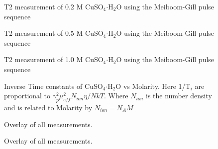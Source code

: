   \begin{figure}[h]
    \resizebox{0.75\textwidth}{!}{}
    \caption{T2 measurement of 0.2 M CuSO$_{4} \boldsymbol{\cdot} $H$_2$O using the Meiboom-Gill pulse sequence }
    \label{figAp:0d2_t2}
  \end{figure}

  \begin{figure}[h]
    \resizebox{0.75\textwidth}{!}{}
    \caption{T2 measurement of 0.5 M CuSO$_{4} \boldsymbol{\cdot} $H$_2$O using the Meiboom-Gill pulse sequence }
    \label{figAp:0d5_t2}
  \end{figure}

  \begin{figure}[h]
    \resizebox{0.75\textwidth}{!}{}
    \caption{T2 measurement of 1.0 M CuSO$_{4} \boldsymbol{\cdot} $H$_2$O using the Meiboom-Gill pulse sequence }
    \label{figAp:1d0_t2}
  \end{figure}



  \begin{figure}[h]
    \resizebox{0.75\textwidth}{!}{}
    \caption{Inverse Time constants of CuSO$_{4} \boldsymbol{\cdot} $H$_2$O vs Molarity. Here 1/T$_i$ are proportional to $\gamma^2_p \mu^2_{eff} N_{ion} \eta / NkT$. Where $N_{ion}$ is the number density and is related to Molarity by $N_{ion} = N_A M$ }
    \label{figAp:cu_linear}
  \end{figure}


 \begin{figure}[h]
  \resizebox{0.75\textwidth}{!}{}
  \caption{Overlay of all \cuso \tc measurements. }
  \label{figAp:sumt2}
\end{figure}


\begin{figure}[h]
  \resizebox{0.75\textwidth}{!}{}
  \caption{Overlay of all \cuso \tg measurements. }
  \label{figAp:sumt2}
\end{figure}
